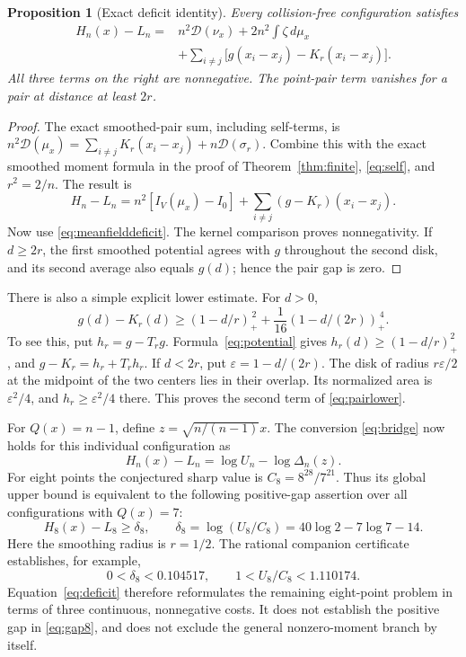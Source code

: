 \documentclass[11pt,a4paper]{article}
\newtheorem{proposition}[theorem]{Proposition}
\theoremstyle{remark}
\newcommand{\dd}{\,d}
\newcommand{\D}{\mathcal D}
\newcommand{\pos}[1]{\left(#1\right)_+}
\numberwithin{equation}{section}
\begin{document}
\begin{proposition}[Exact deficit identity]\label{prop:deficit}
Every collision-free configuration satisfies
\begin{equation}\label{eq:deficit}
 \begin{split}
 H_n(x)-L_n={}&n^2\D(\nu_x)+2n^2\int\zeta\dd\mu_x\\
 &+\sum_{i\ne j}
      \bigl[g(x_i-x_j)-K_r(x_i-x_j)\bigr].
 \end{split}
\end{equation}
All three terms on the right are nonnegative. The point-pair term
vanishes for a pair at distance at least \(2r\).
\end{proposition}
\begin{proof}
The exact smoothed-pair sum, including self-terms, is
\(n^2\D(\mu_x)=\sum_{i\ne j}K_r(x_i-x_j)+n\D(\sigma_r)\).
Combine this with the exact smoothed moment formula in the proof of
Theorem~\ref{thm:finite}, \eqref{eq:self}, and \(r^2=2/n\).
The result is
\[
 H_n-L_n=n^2[I_V(\mu_x)-I_0]+\sum_{i\ne j}(g-K_r)(x_i-x_j).
\]
Now use \eqref{eq:meanfielddeficit}. The kernel comparison proves
nonnegativity. If \(d\ge2r\), the first smoothed potential agrees with
\(g\) throughout the second disk, and its second average also equals
\(g(d)\); hence the pair gap is zero.
\end{proof}
There is also a simple explicit lower estimate. For \(d>0\),
\begin{equation}\label{eq:pairlower}
 g(d)-K_r(d)\ge
 \pos{1-d/r}^{\,2}+\frac1{16}\pos{1-d/(2r)}^{\,4}.
\end{equation}
To see this, put \(h_r=g-T_rg\). Formula~\eqref{eq:potential} gives
\(h_r(d)\ge\pos{1-d/r}^2\), and \(g-K_r=h_r+T_rh_r\).
If \(d<2r\), put \(\varepsilon=1-d/(2r)\).
The disk of radius \(r\varepsilon/2\) at the midpoint of the two
centers lies in their overlap. Its normalized area is
\(\varepsilon^2/4\), and \(h_r\ge\varepsilon^2/4\) there.
This proves the second term of \eqref{eq:pairlower}.

For \(Q(x)=n-1\), define \(z=\sqrt{n/(n-1)}x\). The conversion
\eqref{eq:bridge} now holds for this individual configuration as
\begin{equation}\label{eq:configdeficit}
 H_n(x)-L_n=\log U_n-\log\Delta_n(z).
\end{equation}
For eight points the conjectured sharp value is
\(C_8=8^{28}/7^{21}\). Thus its global upper bound is equivalent to
the following positive-gap assertion over all configurations with
\(Q(x)=7\):
\begin{equation}\label{eq:gap8}
 H_8(x)-L_8\ge\delta_8,\qquad
 \delta_8=\log(U_8/C_8)=40\log2-7\log7-14 .
\end{equation}
Here the smoothing radius is \(r=1/2\). The rational companion
certificate establishes, for example,
\[
 0<\delta_8<0.104517,\qquad 1<U_8/C_8<1.110174.
\]
Equation~\eqref{eq:deficit} therefore reformulates the remaining
eight-point problem in terms of three continuous, nonnegative costs.
It does not establish the positive gap in \eqref{eq:gap8}, and does not
exclude the general nonzero-moment branch by itself.
\end{document}
